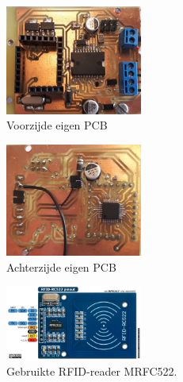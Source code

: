 \begin{figure}[h]
\centering
\includegraphics[width=0.4\textwidth]{voorzijde.png}
\caption{Voorzijde eigen PCB}
\label{fig:voorzijde}
\end{figure}

\begin{figure}[h]
\centering
\includegraphics[width=0.4\textwidth]{achterzijde.png}
\caption{Achterzijde eigen PCB}
\label{fig:achterzijde}
\end{figure}

\begin{figure}[h]
\centering
\includegraphics[width=0.4\textwidth]{MRFC522.png}
\caption{Gebruikte RFID-reader MRFC522. \label{fig:MRFC522}}
\label{fig:ACEquiv}
\end{figure}




